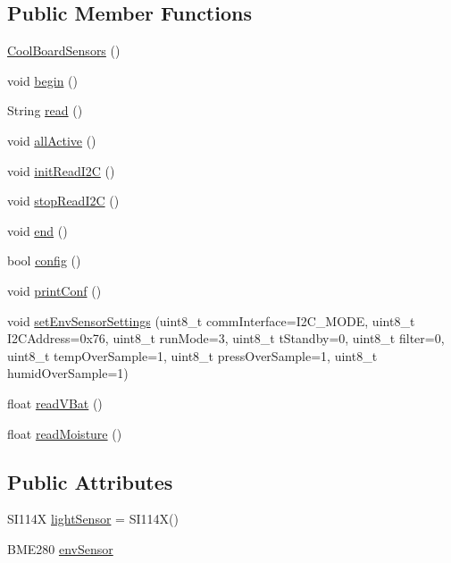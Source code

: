 \subsection*{Public Member Functions}
\begin{DoxyCompactItemize}
\item 
\hyperlink{classCoolBoardSensors_a91ff2a02f5486f90cf2413a1cf8a9ed4}{Cool\+Board\+Sensors} ()
\item 
void \hyperlink{classCoolBoardSensors_a97095823ef7c8f5290812f1405b966b3}{begin} ()
\item 
String \hyperlink{classCoolBoardSensors_a91badb2539d91fda8679f2a597874c48}{read} ()
\item 
void \hyperlink{classCoolBoardSensors_aa432c5aac88f89c31a10766390f23e0b}{all\+Active} ()
\item 
void \hyperlink{classCoolBoardSensors_acad6a8418c66d36868caca23c844ecb6}{init\+Read\+I2C} ()
\item 
void \hyperlink{classCoolBoardSensors_ab67b900b9e5e7c18d52d2d9107ba171b}{stop\+Read\+I2C} ()
\item 
void \hyperlink{classCoolBoardSensors_a4902b69f6e628bd6557193758fdd2bae}{end} ()
\item 
bool \hyperlink{classCoolBoardSensors_a9a218895c5423375c33c08f2c56fb23a}{config} ()
\item 
void \hyperlink{classCoolBoardSensors_af6fd79505815b204c178617ecf54c873}{print\+Conf} ()
\item 
void \hyperlink{classCoolBoardSensors_a406307ffd70272282d91479c7ed8d66f}{set\+Env\+Sensor\+Settings} (uint8\+\_\+t comm\+Interface=I2\+C\+\_\+\+M\+O\+DE, uint8\+\_\+t I2\+C\+Address=0x76, uint8\+\_\+t run\+Mode=3, uint8\+\_\+t t\+Standby=0, uint8\+\_\+t filter=0, uint8\+\_\+t temp\+Over\+Sample=1, uint8\+\_\+t press\+Over\+Sample=1, uint8\+\_\+t humid\+Over\+Sample=1)
\item 
float \hyperlink{classCoolBoardSensors_a6944b6ea7bce8e2fce1b434acfd9d5f3}{read\+V\+Bat} ()
\item 
float \hyperlink{classCoolBoardSensors_a8761bff50373c485f4465c8db47d0633}{read\+Moisture} ()
\end{DoxyCompactItemize}
\subsection*{Public Attributes}
\begin{DoxyCompactItemize}
\item 
S\+I114X \hyperlink{classCoolBoardSensors_a3e397300fb707dd193e909a757bf6102}{light\+Sensor} = S\+I114X()
\item 
B\+M\+E280 \hyperlink{classCoolBoardSensors_a868e38985e9a2412829fa2790ca13e2e}{env\+Sensor}
\end{DoxyCompactItemize}
